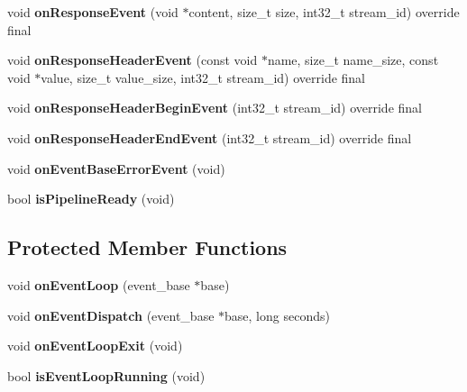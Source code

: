 \begin{DoxyCompactItemize}
\mbox{\label{classhttp2_1_1HTTP2Pipeline_a10543373c5537f6fa210ebf7ae6f5f37}} 
void {\bfseries on\+Response\+Event} (void $\ast$content, size\+\_\+t size, int32\+\_\+t stream\+\_\+id) override final
\item 
\mbox{\label{classhttp2_1_1HTTP2Pipeline_ab9b5653e64cd9c877c8a2dfd903afe85}} 
void {\bfseries on\+Response\+Header\+Event} (const void $\ast$name, size\+\_\+t name\+\_\+size, const void $\ast$value, size\+\_\+t value\+\_\+size, int32\+\_\+t stream\+\_\+id) override final
\item 
\mbox{\label{classhttp2_1_1HTTP2Pipeline_a81d78bc5a1951899b93dbb78c1f5e8bd}} 
void {\bfseries on\+Response\+Header\+Begin\+Event} (int32\+\_\+t stream\+\_\+id) override final
\item 
\mbox{\label{classhttp2_1_1HTTP2Pipeline_aa243a9cac73e023f96d1355aac3977e3}} 
void {\bfseries on\+Response\+Header\+End\+Event} (int32\+\_\+t stream\+\_\+id) override final
\item 
\mbox{\label{classhttp2_1_1HTTP2Pipeline_aaecbb345448e191da1faae5172ac2e0a}} 
void {\bfseries on\+Event\+Base\+Error\+Event} (void)
\item 
\mbox{\label{classhttp2_1_1HTTP2Pipeline_af61be46e5ce1db62ac16a1ba650a76bf}} 
bool {\bfseries is\+Pipeline\+Ready} (void)
\end{DoxyCompactItemize}
\subsection*{Protected Member Functions}
\begin{DoxyCompactItemize}
\item 
\mbox{\label{classhttp2_1_1HTTP2Pipeline_af79360a92313b4debe0ee3ac7a8c085f}} 
void {\bfseries on\+Event\+Loop} (event\+\_\+base $\ast$base)
\item 
\mbox{\label{classhttp2_1_1HTTP2Pipeline_a4b96c2bb53bfe5cd1413b09d990a129e}} 
void {\bfseries on\+Event\+Dispatch} (event\+\_\+base $\ast$base, long seconds)
\item 
\mbox{\label{classhttp2_1_1HTTP2Pipeline_aad8300fe9c3955bf5ed40c701bfd44f2}} 
void {\bfseries on\+Event\+Loop\+Exit} (void)
\item 
\mbox{\label{classhttp2_1_1HTTP2Pipeline_a7950a8b3a8c55aaf5023a3b8d860d63c}} 
bool {\bfseries is\+Event\+Loop\+Running} (void)
\end{DoxyCompactItemize}
